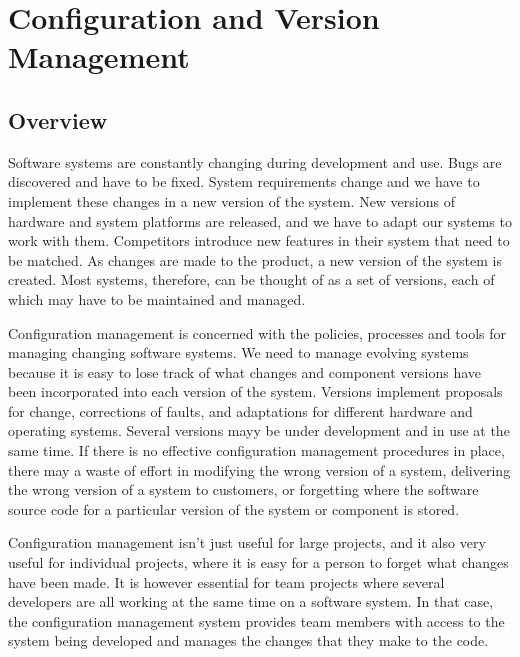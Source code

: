 \chapter{Configuration and Version Management}
\section{Overview}
Software systems are constantly changing during development and use. Bugs are discovered and have to be fixed. System requirements change and we have to implement these changes in a new version of the system. New versions of hardware and system platforms are released, and we have to adapt our systems to work with them. Competitors introduce new features in their system that need to be matched. As changes are made to the product, a new version of the system is created. Most systems, therefore, can be thought of as a set of versions, each of which may have to be maintained and managed.

Configuration management is concerned with the policies, processes and tools for managing changing software systems. We need to manage evolving systems because it is easy to lose track of what changes and component versions have been incorporated into each version of the system. Versions implement proposals for change, corrections of faults, and adaptations for different hardware and operating systems. Several versions mayy be under development and in use at the same time. If there is no effective configuration management procedures in place, there may a waste of effort in modifying the wrong version of a system, delivering the wrong version of a system to customers, or forgetting where the software source code for a particular version of the system or component is stored.

Configuration management isn't just useful for large projects, and it also very useful for individual projects, where it is easy for a person to forget what changes have been made. It is however essential for team projects where several developers are all working at the same time on a software system. In that case, the configuration management system provides team members with access to the system being developed and manages the changes that they make to the code.

